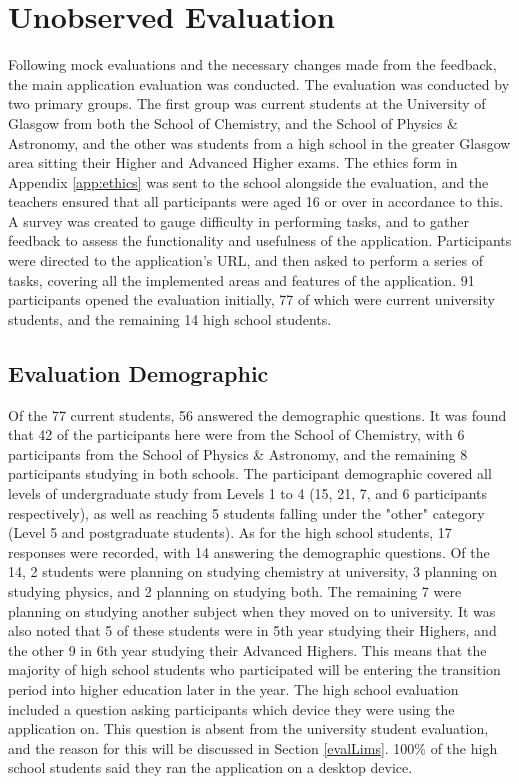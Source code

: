 \documentclass{l4proj}
\begin{document}
\section{Unobserved Evaluation}
Following mock evaluations and the necessary changes made from the feedback,  the main application evaluation was conducted. The evaluation was conducted by two primary groups. The first group was current students at the University of Glasgow from both the School of Chemistry,  and the School of Physics \& Astronomy,  and the other was students from a high school in the greater Glasgow area sitting their Higher and Advanced Higher exams. The ethics form in Appendix \ref{app:ethics} was sent to the school alongside the evaluation,  and the teachers ensured that all participants were aged 16 or over in accordance to this. A survey was created to gauge difficulty in performing tasks, and to gather feedback to assess the functionality and usefulness of the application. Participants were directed to the application's URL, and then asked to perform a series of tasks,  covering all the implemented areas and features of the application. 91 participants opened the evaluation initially,  77 of which were current university students,  and the remaining 14 high school students.

\subsection{Evaluation Demographic}
Of the 77 current students,  56 answered the demographic questions. It was found that 42 of the participants here were from the School of Chemistry,  with 6 participants from the School of Physics \& Astronomy,  and the remaining 8 participants studying in both schools. The participant demographic covered all levels of undergraduate study from Levels 1 to 4 (15,  21,  7,  and 6 participants respectively),  as well as reaching 5 students falling under the "other" category (Level 5 and postgraduate students). As for the high school students,  17 responses were recorded,  with 14 answering the demographic questions. Of the 14,  2 students were planning on studying chemistry at university,  3 planning on studying physics,  and 2 planning on studying both. The remaining 7 were planning on studying another subject when they moved on to university. It was also noted that 5 of these students were in 5th year studying their Highers,  and the other 9 in 6th year studying their Advanced Highers. This means that the majority of high school students who participated will be entering the transition period into higher education later in the year. The high school evaluation included a question asking participants which device they were using the application on. This question is absent from the university student evaluation,  and the reason for this will be discussed in Section \ref{evalLims}. 100\% of the high school students said they ran the application on a desktop device.
\end{document}
